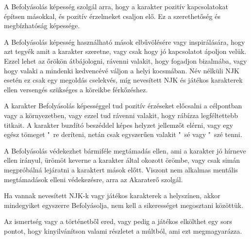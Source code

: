 
A Befolyásolás képesség szolgál arra, hogy a karakter pozitív kapcsolatokat építsen másokkal, és pozitív érzelmeket csaljon elő. Ez a szerethetőség és megbízhatóság képessége.

\overcome A Befolyásolás képesség használható mások elbűvölésére vagy inspirálására, hogy azt tegyék amit a karakter szeretne, vagy csak hogy jó kapcsolatot ápoljon velük. Ezzel lehet az őrökön átbájologni, rávenni valakit, hogy fogadjon bizalmába, vagy hogy valaki a mindenki kedvencévé váljon a helyi kocsmában. Név nélküli NJK esetén ez csak egy megoldás cselekvés, míg nevesített NJK és játékos karakterek ellen versengés szükséges a köreikbe férkőzéshez.

\advantage A karakter Befolyásolás képességgel tud pozitív érzéseket előcsalni a célpontban vagy a környezetben, vagy ezzel tud rávenni valakit, hogy rábízza legféltettebb titkait. A karakter buzdító beszéddel képes  helyzet jellemzőt elérni, vagy egy egész tömeget "~re deríteni, netán csak egyszerűen valakit "~sé vagy "~szé tenni.

\noattackatall

 A Befolyásolás védekezhet bármiféle megtámadás ellen, ami a karakter jó hírneve ellen irányul, ürömöt keverne a karakter által okozott örömbe, vagy csak simán megpróbálná lejáratni a karaktert mások előtt. Viszont nem alkalmas mentális megtámadások elleni védekezésre, arra az Akaraterő szolgál.



Ha vannak nevesített NJK-k vagy játékos karakterek a helyszínen, akkor mindegyiket egyszerre Befolyásolja, nem kell a sikerességet megosztani közöttük.


Az ismertség vagy a történetből ered, vagy pedig a játékos elkölthet egy sors pontot, hogy kinyilvánítson valami részletet a múltból, ami ezt megmagyarázza.
